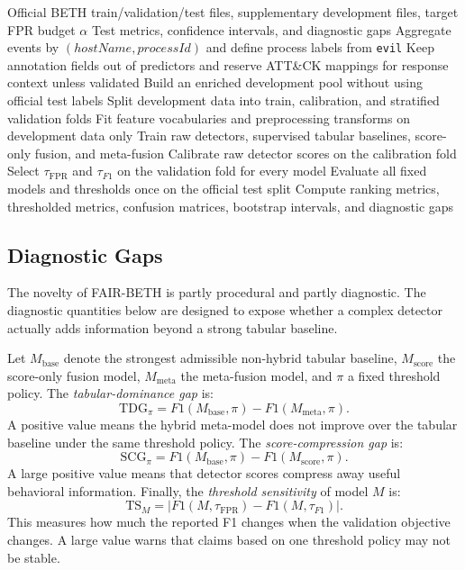 \documentclass[journal]{IEEEtran}
\begin{document}
\begin{algorithm}[t]
\caption{FAIR-BETH evaluation protocol}
\label{alg:fairbeth}
\begin{algorithmic}[1]
\Require Official BETH train/validation/test files, supplementary development files, target FPR budget $\alpha$
\Ensure Test metrics, confidence intervals, and diagnostic gaps
\State Aggregate events by $(hostName, processId)$ and define process labels from \texttt{evil}
\State Keep annotation fields out of predictors and reserve ATT\&CK mappings for response context unless validated
\State Build an enriched development pool without using official test labels
\State Split development data into train, calibration, and stratified validation folds
\State Fit feature vocabularies and preprocessing transforms on development data only
\State Train raw detectors, supervised tabular baselines, score-only fusion, and meta-fusion
\State Calibrate raw detector scores on the calibration fold
\State Select $\tau_{\mathrm{FPR}}$ and $\tau_{F1}$ on the validation fold for every model
\State Evaluate all fixed models and thresholds once on the official test split
\State Compute ranking metrics, thresholded metrics, confusion matrices, bootstrap intervals, and diagnostic gaps
\end{algorithmic}
\end{algorithm}

\subsection{Diagnostic Gaps}

The novelty of FAIR-BETH is partly procedural and partly diagnostic. The diagnostic quantities below are designed to expose whether a complex detector actually adds information beyond a strong tabular baseline.

Let $M_{\mathrm{base}}$ denote the strongest admissible non-hybrid tabular baseline, $M_{\mathrm{score}}$ the score-only fusion model, $M_{\mathrm{meta}}$ the meta-fusion model, and $\pi$ a fixed threshold policy. The \emph{tabular-dominance gap} is:
\[
\mathrm{TDG}_{\pi}=F1(M_{\mathrm{base}},\pi)-F1(M_{\mathrm{meta}},\pi).
\]
A positive value means the hybrid meta-model does not improve over the tabular baseline under the same threshold policy. The \emph{score-compression gap} is:
\[
\mathrm{SCG}_{\pi}=F1(M_{\mathrm{base}},\pi)-F1(M_{\mathrm{score}},\pi).
\]
A large positive value means that detector scores compress away useful behavioral information. Finally, the \emph{threshold sensitivity} of model $M$ is:
\[
\mathrm{TS}_{M}=|F1(M,\tau_{\mathrm{FPR}})-F1(M,\tau_{F1})|.
\]
This measures how much the reported F1 changes when the validation objective changes. A large value warns that claims based on one threshold policy may not be stable.
\end{document}
